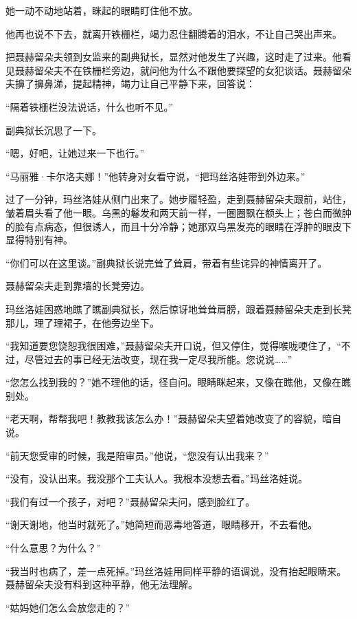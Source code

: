 \documentclass[12pt,UTF-8,openany]{ctexbook}
\begin{document}
\begin{large}
    她一动不动地站着，眯起的眼睛盯住他不放。
    
    他再也说不下去，就离开铁栅栏，竭力忍住翻腾着的泪水，不让自己哭出声来。
    
    把聂赫留朵夫领到女监来的副典狱长，显然对他发生了兴趣，这时走了过来。他看见聂赫留朵夫不在铁栅栏旁边，就问他为什么不跟他要探望的女犯谈话。聂赫留朵夫擤了擤鼻涕，提起精神，竭力让自己平静下来，回答说：
    
    “隔着铁栅栏没法说话，什么也听不见。”
    
    副典狱长沉思了一下。
    
    “嗯，好吧，让她过来一下也行。”
    
    “马丽雅·卡尔洛夫娜！”他转身对女看守说，“把玛丝洛娃带到外边来。”
    
    过了一分钟，玛丝洛娃从侧门出来了。她步履轻盈，走到聂赫留朵夫跟前，站住，皱着眉头看了他一眼。乌黑的鬈发和两天前一样，一圈圈飘在额头上；苍白而微肿的脸有点病态，但很诱人，而且十分冷静；她那双乌黑发亮的眼睛在浮肿的眼皮下显得特别有神。
    
    “你们可以在这里谈。”副典狱长说完耸了耸肩，带着有些诧异的神情离开了。
    
    聂赫留朵夫走到靠墙的长凳旁边。
    
    玛丝洛娃困惑地瞧了瞧副典狱长，然后惊讶地耸耸肩膀，跟着聂赫留朵夫走到长凳那儿，理了理裙子，在他旁边坐下。
    
    “我知道要您饶恕我很困难，”聂赫留朵夫开口说，但又停住，觉得喉咙哽住了，“不过，尽管过去的事已经无法改变，现在我一定尽我所能。您说说……”
    
    “您怎么找到我的？”她不理他的话，径自问。眼睛眯起来，又像在瞧他，又像在瞧别处。
    
    “老天啊，帮帮我吧！教教我该怎么办！”聂赫留朵夫望着她改变了的容貌，暗自说。
    
    “前天您受审的时候，我是陪审员。”他说，“您没有认出我来？”
    
    “没有，没认出来。我没那个工夫认人。我根本没想去看。”玛丝洛娃说。
    
    “我们有过一个孩子，对吧？”聂赫留朵夫问，感到脸红了。
    
    “谢天谢地，他当时就死了。”她简短而恶毒地答道，眼睛移开，不去看他。
    
    “什么意思？为什么？”
    
    “我当时也病了，差一点死掉。”玛丝洛娃用同样平静的语调说，没有抬起眼睛来。聂赫留朵夫没有料到这种平静，他无法理解。
    
    “姑妈她们怎么会放您走的？”
    

\end{large}
\end{document}
